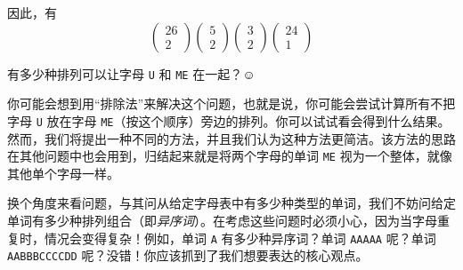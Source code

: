 \begin{example}
\begin{enumerate}
\begin{enumerate}[label=(\arabic*)]
              \end{enumerate}
              因此，有
              \[\begin{pmatrix} 26\\2 \end{pmatrix}\begin{pmatrix} 5\\2 \end{pmatrix}\begin{pmatrix} 3\\2 \end{pmatrix}\begin{pmatrix} 24\\1 \end{pmatrix}\]
    \end{enumerate}
\end{example}

\begin{example}
    有多少种排列可以让字母 \verb|U| 和 \verb|ME| 在一起？$\smiley{}$

    你可能会想到用``排除法''来解决这个问题，也就是说，你可能会尝试计算所有不把字母 \verb|U| 放在字母 \verb|ME|（按这个顺序）旁边的排列。你可以试试看会得到什么结果。然而，我们将提出一种不同的方法，并且我们认为这种方法更简洁。该方法的思路在其他问题中也会用到，归结起来就是将两个字母的单词 \verb|ME| 视为一个整体，就像其他单个字母一样。

    换个角度来看问题，与其问从给定字母表中有多少种类型的单词，我们不妨问给定单词有多少种排列组合（即\emph{异序词}）。在考虑这些问题时必须小心，因为当字母重复时，情况会变得复杂！例如，单词 \verb|A| 有多少种异序词？单词 \verb|AAAAA| 呢？单词 \verb|AABBBCCCCDD| 呢？没错！你应该抓到了我们想要表达的核心观点。
\end{example}

